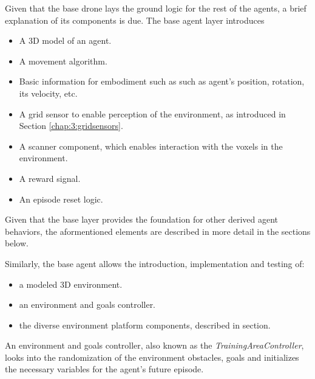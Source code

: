 Given that the base drone lays the ground logic for the rest of the agents, a brief explanation of its components is due. The base agent layer introduces 
\begin{itemize}
    \item A 3D model of an agent.
    \item A movement algorithm.
    \item Basic information for embodiment such as such as agent's position, rotation, its velocity, etc. 
    \item A grid sensor to enable perception of the environment, as introduced in Section \ref{chap:3:gridsensors}.  
    \item A scanner component, which enables interaction with the voxels in the environment.
    \item A reward signal.
    \item An episode reset logic.
\end{itemize}

Given that the base layer provides the foundation for other derived agent behaviors, the aformentioned elements are described in more detail in the sections below.

Similarly, the base agent allows the introduction, implementation and testing of:
 
\begin{itemize}
    \item a modeled 3D environment.
    \item an environment and goals controller. 
    \item the diverse environment platform components, described in section.
\end{itemize}
An environment and goals controller, also known as the \textit{TrainingAreaController}, looks into the randomization of the environment obstacles, goals and initializes the necessary variables for the agent’s future episode.



